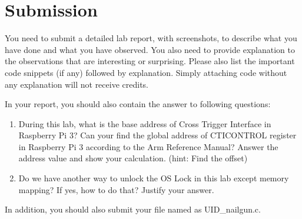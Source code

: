 
\section{Submission}
You need to submit a detailed lab report, with screenshots, to describe what you have done and what you have observed. You also need to provide explanation to the observations that are interesting or surprising. Please also list the important code snippets (if any) followed by explanation. Simply attaching code without any explanation will not receive credits.

In your report, you should also contain the answer to following questions:
\begin{enumerate}
  \item During this lab, what is the base address of Cross Trigger Interface in Raspberry Pi 3? Can your find the global address of CTICONTROL register in Raspberry Pi 3 according to the Arm Reference Manual? Answer the address value and show your calculation. (hint: Find the offset)
  \item Do we have another way to unlock the OS Lock in this lab except memory mapping? If yes, how to do that? Justify your answer.
\end{enumerate}

In addition, you should also submit your file named as UID\_nailgun.c. 




